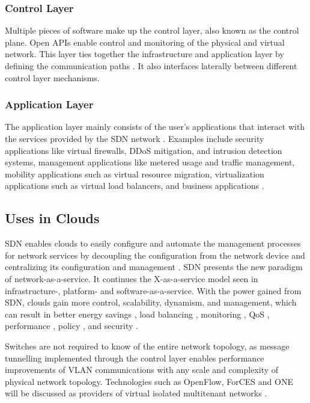 \documentclass[12pt]{article}
\begin{document}
\subsubsection{Control Layer}

Multiple pieces of software make up the control layer, also known as the control plane. Open APIs enable control and monitoring of the physical and virtual network. This layer ties together the infrastructure and application layer by defining the communication paths \cite{yan2016software}. It also interfaces laterally between different control layer mechanisms.


\subsubsection{Application Layer}

The application layer mainly consists of the user's applications that interact with the services provided by the SDN network \cite{yan2016software}. Examples include security applications like virtual firewalls, DDoS mitigation, and intrusion detection systems, management applications like metered usage and traffic management, mobility applications such as virtual resource migration, virtualization applications such as virtual load balancers, and business applications  \cite{larsen2012architecture}.



\subsection{Uses in Clouds}

SDN enables clouds to easily configure and automate the management processes for network services by decoupling the configuration from the network device and centralizing its configuration and management \cite{yan2016software}. SDN presents the new paradigm of network-as-a-service. It continues the X-as-a-service model seen in infrastructure-, platform- and software-as-a-service. With the power gained from SDN, clouds gain more control, scalability, dynamism, and management, which can result in better energy savings \cite{yen2014sdn,lin2013flow}, load balancing \cite{yen2014sdn}, monitoring \cite{yen2014sdn}, QoS \cite{akella2014quality}, performance \cite{cziva2014sdn, lin2013flow}, policy \cite{banikazemi2013meridian,akella2014quality}, and security \cite{seeber2014improving}.

Switches are not required to know of the entire network topology, as message tunnelling implemented through the control layer enables performance improvements of VLAN communications with any scale and complexity of physical network topology. Technologies such as OpenFlow, ForCES and ONE will be discussed as providers of virtual isolated multitenant networks \cite{wang2015survey}.
\end{document}
